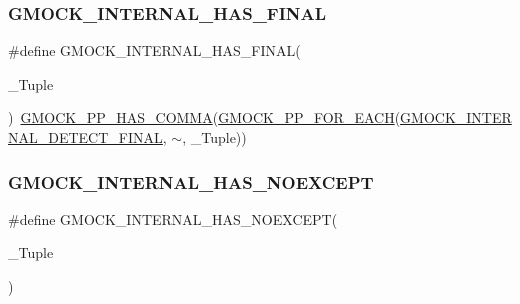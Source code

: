 \mbox{\label{googletest-master_2googlemock_2include_2gmock_2gmock-function-mocker_8h_a1c4b4308770f5ff925ba9ed1bf578644}} 
\subsubsection{\texorpdfstring{GMOCK\_INTERNAL\_HAS\_FINAL}{GMOCK\_INTERNAL\_HAS\_FINAL}}
{\footnotesize\ttfamily \#define G\+M\+O\+C\+K\+\_\+\+I\+N\+T\+E\+R\+N\+A\+L\+\_\+\+H\+A\+S\+\_\+\+F\+I\+N\+AL(\begin{DoxyParamCaption}\item[{}]{\+\_\+\+Tuple }\end{DoxyParamCaption})~\mbox{\hyperlink{_obj__test_2lib_2googletest-master_2googlemock_2include_2gmock_2internal_2gmock-pp_8h_aaf83e01e56eb26d7eac9efb477587510}{G\+M\+O\+C\+K\+\_\+\+P\+P\+\_\+\+H\+A\+S\+\_\+\+C\+O\+M\+MA}}(\mbox{\hyperlink{_obj__test_2lib_2googletest-master_2googlemock_2include_2gmock_2internal_2gmock-pp_8h_abc9368d9b0960531e3cfb9e5d6a41816}{G\+M\+O\+C\+K\+\_\+\+P\+P\+\_\+\+F\+O\+R\+\_\+\+E\+A\+CH}}(\mbox{\hyperlink{_obj__test_2lib_2googletest-master_2googlemock_2include_2gmock_2gmock-function-mocker_8h_a2b0f53a8fea3a79d52582daf294737b0}{G\+M\+O\+C\+K\+\_\+\+I\+N\+T\+E\+R\+N\+A\+L\+\_\+\+D\+E\+T\+E\+C\+T\+\_\+\+F\+I\+N\+AL}}, $\sim$, \+\_\+\+Tuple))}

\mbox{\label{googletest-master_2googlemock_2include_2gmock_2gmock-function-mocker_8h_adfda8885b556882ad81e7ea73ce26cf1}} 
\subsubsection{\texorpdfstring{GMOCK\_INTERNAL\_HAS\_NOEXCEPT}{GMOCK\_INTERNAL\_HAS\_NOEXCEPT}}
{\footnotesize\ttfamily \#define G\+M\+O\+C\+K\+\_\+\+I\+N\+T\+E\+R\+N\+A\+L\+\_\+\+H\+A\+S\+\_\+\+N\+O\+E\+X\+C\+E\+PT(\begin{DoxyParamCaption}\item[{}]{\+\_\+\+Tuple }\end{DoxyParamCaption})}

